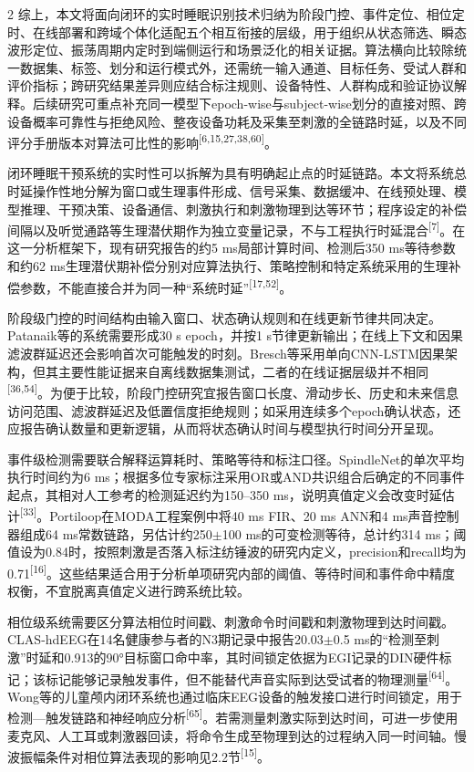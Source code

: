 \documentclass[UTF8,zihao=5,fontset=none]{ctexart}
\newcommand{\hei}{\CJKfamily{hei}}
\newcommand{\leveltwo}[1]{%
  \par\noindent{\hei\fontsize{10.5pt}{15.6pt}\selectfont\bfseries #1\par}}
\newcommand{\refcite}[1]{\nolinebreak[4]\textsuperscript{[#1]}}
\begin{document}
\begin{multicols}{2}
综上，本文将面向闭环的实时睡眠识别技术归纳为阶段门控、事件定位、相位定时、在线部署和跨域个体化适配五个相互衔接的层级，用于组织从状态筛选、瞬态波形定位、振荡周期内定时到端侧运行和场景泛化的相关证据。算法横向比较除统一数据集、标签、划分和运行模式外，还需统一输入通道、目标任务、受试人群和评价指标；跨研究结果差异则应结合标注规则、设备特性、人群构成和验证协议解释。后续研究可重点补充同一模型下epoch-wise与subject-wise划分的直接对照、跨设备概率可靠性与拒绝风险、整夜设备功耗及采集至刺激的全链路时延，以及不同评分手册版本对算法可比性的影响\refcite{6,15,27,38,60}。\par

\leveltwo{2.3 闭环时延链路、同步机制与机会级评价}

闭环睡眠干预系统的实时性可以拆解为具有明确起止点的时延链路。本文将系统总时延操作性地分解为窗口或生理事件形成、信号采集、数据缓冲、在线预处理、模型推理、干预决策、设备通信、刺激执行和刺激物理到达等环节；程序设定的补偿间隔以及听觉通路等生理潜伏期作为独立变量记录，不与工程执行时延混合\refcite{7}。在这一分析框架下，现有研究报告的约5 ms局部计算时间、检测后350 ms等待参数和约62 ms生理潜伏期补偿分别对应算法执行、策略控制和特定系统采用的生理补偿参数，不能直接合并为同一种“系统时延”\refcite{17,52}。\par

阶段级门控的时间结构由输入窗口、状态确认规则和在线更新节律共同决定。Patanaik等的系统需要形成30 s epoch，并按1 s节律更新输出；在线上下文和因果滤波群延迟还会影响首次可能触发的时刻。Bresch等采用单向CNN-LSTM因果架构，但其主要性能证据来自离线数据集测试，二者的在线证据层级并不相同\refcite{36,54}。为便于比较，阶段门控研究宜报告窗口长度、滑动步长、历史和未来信息访问范围、滤波群延迟及低置信度拒绝规则；如采用连续多个epoch确认状态，还应报告确认数量和更新逻辑，从而将状态确认时间与模型执行时间分开呈现。\par

事件级检测需要联合解释运算耗时、策略等待和标注口径。SpindleNet的单次平均执行时间约为6 ms；根据多位专家标注采用OR或AND共识组合后确定的不同事件起点，其相对人工参考的检测延迟约为150--350 ms，说明真值定义会改变时延估计\refcite{33}。Portiloop在MODA工程案例中将40 ms FIR、20 ms ANN和4 ms声音控制器组成64 ms常数链路，另估计约250$\pm$100 ms的可变检测等待，总计约314 ms；阈值设为0.84时，按照刺激是否落入标注纺锤波的研究内定义，precision和recall均为0.71\refcite{16}。这些结果适合用于分析单项研究内部的阈值、等待时间和事件命中精度权衡，不宜脱离真值定义进行跨系统比较。\par

相位级系统需要区分算法相位时间戳、刺激命令时间戳和刺激物理到达时间戳。CLAS-hdEEG在14名健康参与者的N3期记录中报告20.03$\pm$0.5 ms的“检测至刺激”时延和0.913的90°目标窗口命中率，其时间锁定依据为EGI记录的DIN硬件标记；该标记能够记录触发事件，但不能替代声音实际到达受试者的物理测量\refcite{64}。Wong等的儿童颅内闭环系统也通过临床EEG设备的触发接口进行时间锁定，用于检测—触发链路和神经响应分析\refcite{65}。若需测量刺激实际到达时间，可进一步使用麦克风、人工耳或刺激器回读，将命令生成至物理到达的过程纳入同一时间轴。慢波振幅条件对相位算法表现的影响见2.2节\refcite{15}。\par


\end{multicols}
\end{document}

